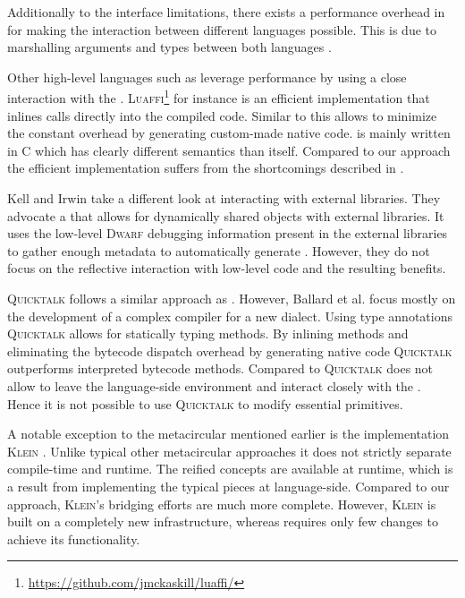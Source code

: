 Additionally to the interface limitations, there exists a performance overhead in \FFI for making the interaction between different languages possible. 
This is due to marshalling arguments and types between both languages \cite{Fish00a,Repp06b}.


Other high-level languages such as \Lua leverage \FFI performance by using a close interaction with the \JIT.
\textsc{Luaffi}\footnote{\url{https://github.com/jmckaskill/luaffi/}} for instance is an efficient \Lua implementation that inlines \FFI calls directly into the \JIT compiled code.
Similar to \B this allows to minimize the constant overhead by generating custom-made native code.
\Luajit is mainly written in C which has clearly different semantics than \Lua itself.
Compared to our approach the efficient \VM implementation suffers from the shortcomings described in . 

Kell and Irwin \cite{Kell11a} take a different look at interacting with external libraries.
They advocate a \Python \VM that allows for dynamically shared objects with external libraries.
It uses the low-level \textsc{Dwarf} debugging information present in the external libraries to gather enough metadata to automatically generate \FFI{}.
However, they do not focus on the reflective interaction with low-level code and the resulting benefits. 

\textsc{Quicktalk} \cite{Ball86a} follows a similar approach as \WF.
However, Ballard et al. focus mostly on the development of a complex compiler for a new \ST dialect.
Using type annotations \textsc{Quicktalk} allows for statically typing methods.
By inlining methods and eliminating the bytecode dispatch overhead by generating native code \textsc{Quicktalk} outperforms interpreted bytecode methods.
Compared to \WF \textsc{Quicktalk} does not allow to leave the language-side environment and interact closely with the \VM.
Hence it is not possible to use \textsc{Quicktalk} to modify essential primitives.

A notable exception to the metacircular \VMs mentioned earlier is the \Self implementation \textsc{Klein} \cite{Unga05a}.
Unlike typical other metacircular approaches it does not strictly separate compile-time and runtime.
The reified \VM concepts are available at runtime, which is a result from implementing the typical \VM pieces at language-side.
Compared to our approach, \textsc{Klein}'s bridging efforts are much more complete.
However, \textsc{Klein} is built on a completely new \VM infrastructure, whereas \B requires only few changes to achieve its functionality.

